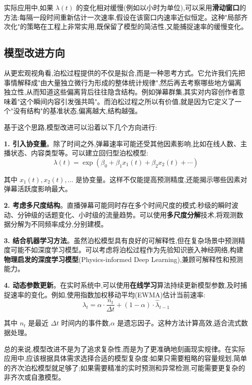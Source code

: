 \documentclass[12pt,a4paper]{article}
\begin{document}
实际应用中,如果 $\lambda(t)$ 的变化相对缓慢(例如以小时为单位),可以采用\textbf{滑动窗口}的方法:每隔一段时间重新估计一次速率,假设在该窗口内速率近似恒定。这种"局部齐次化"的策略在工程上非常实用,既保留了模型的简洁性,又能捕捉速率的缓慢变化。

\subsection{模型改进方向}

从更宏观视角看,泊松过程提供的不仅是拟合,而是一种思考方式。它允许我们先把事情解释成"由大量独立微行为形成的整体统计规律",然后再去考察哪些地方偏离独立性,从而知道这些偏离背后往往隐含结构。例如弹幕群集,其实对内容创作者意味着"这个瞬间内容引发强共鸣"。而泊松过程之所以有价值,就是因为它定义了一个"没有结构"的基准状态,偏离越大,结构越强。

基于这个思路,模型改进可以沿着以下几个方向进行:

\textbf{1. 引入协变量}。除了时间之外,弹幕速率可能还受其他因素影响,比如在线人数、主播状态、内容类型等。可以建立回归型泊松模型:
\begin{equation}
\lambda(t) = \exp(\beta_0 + \beta_1 x_1(t) + \beta_2 x_2(t) + \cdots)
\end{equation}

其中 $x_1(t), x_2(t), \ldots$ 是协变量。这样不仅能提高预测精度,还能揭示哪些因素对弹幕活跃度影响最大。

\textbf{2. 考虑多尺度结构}。直播弹幕可能同时存在多个时间尺度的模式:秒级的瞬时波动、分钟级的话题变化、小时级的流量趋势。可以使用\textbf{多尺度分解}技术,将观测数据分解为不同频率成分,分别建模。

\textbf{3. 结合机器学习方法}。虽然泊松模型具有良好的可解释性,但在复杂场景中预测精度可能不如深度学习模型。可以考虑将泊松过程作为先验知识嵌入神经网络,构建\textbf{物理启发的深度学习模型}(Physics-informed Deep Learning),兼顾可解释性和预测能力。

\textbf{4. 动态参数更新}。在实时系统中,可以使用\textbf{在线学习}算法持续更新模型参数,及时捕捉速率的变化。例如,使用指数加权移动平均(EWMA)估计当前速率:
\begin{equation}
\hat{\lambda}_t = \alpha \cdot \frac{n_t}{\Delta t} + (1-\alpha) \cdot \hat{\lambda}_{t-1}
\end{equation}

其中 $n_t$ 是最近 $\Delta t$ 时间内的事件数,$\alpha$ 是遗忘因子。这种方法计算高效,适合流式数据处理。

总的来说,模型改进不是为了追求复杂性,而是为了更准确地刻画现实规律。在实际应用中,应该根据具体需求选择合适的模型复杂度:如果只需要粗略的容量规划,简单的齐次泊松模型就足够了;如果需要精准的实时预测和异常检测,可能需要更复杂的非齐次或自激模型。
\end{document}
